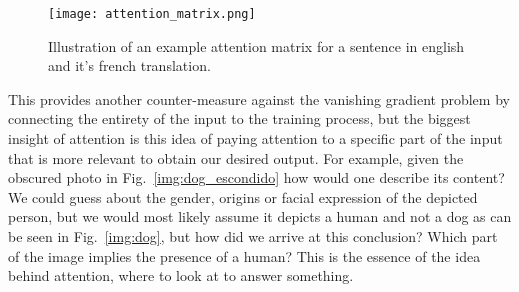 \begin{figure}[!ht]
\centerline{\texttt{[image: attention\_matrix.png]}}
\caption{Illustration \citep{attention_matrix} of an example attention matrix for a sentence in english and it's french translation. }
\end{figure}

This provides another counter-measure against the vanishing gradient problem by connecting the entirety of the input to the training process, but the biggest insight of attention is this idea of paying attention to a specific part of the input that is more relevant to obtain our desired output. For example, given the obscured photo in Fig.~\ref{img:dog_escondido} how would one describe its content? We could guess about the gender, origins or facial expression of the depicted person, but we would most likely assume it depicts a human and not a dog as can be seen in Fig.~\ref{img:dog}, but how did we arrive at this conclusion? Which part of the image implies the presence of a human? This is the essence of the idea behind attention, where to look at to answer something. 





